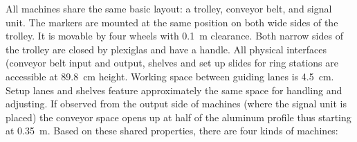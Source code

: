 \documentclass[12pt,twoside]{article}
\begin{document}
All machines share the same basic layout: a trolley, conveyor belt,
and signal unit. The markers are mounted at the same position on both
wide sides of the trolley. It is movable by four wheels with
\SI{0.1}{\metre} clearance. Both narrow sides of the trolley are
closed by plexiglas and have a handle. All physical interfaces
(conveyor belt input and output, shelves and set up slides for ring
stations are accessible at \SI{89.8}{\centi\metre} height. Working
space between guiding lanes is \SI{4.5}{\centi\metre}. Setup lanes and
shelves feature approximately the same space for handling and
adjusting. If observed from the output side of machines (where the
signal unit is placed) the conveyor space opens up at half of the
aluminum profile
thus starting at \SI{0,35}{\metre}. Based on these shared properties,
there are four kinds of machines:
\end{document}
